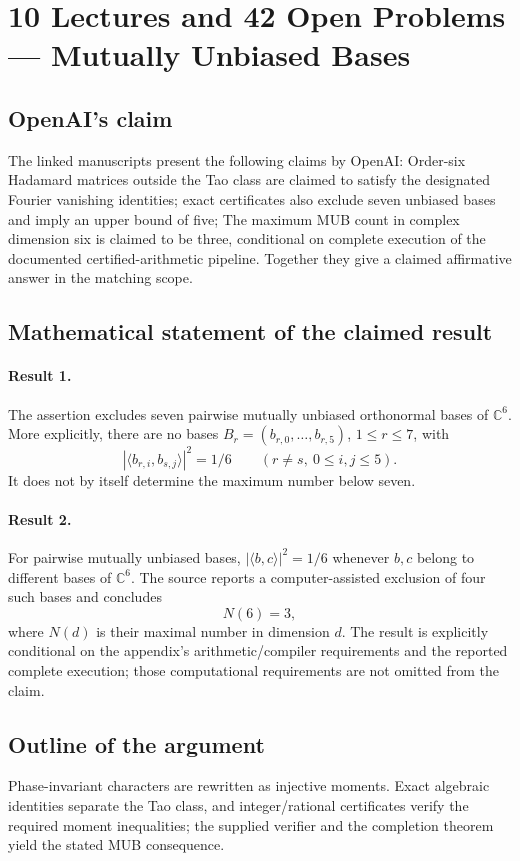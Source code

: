 \documentclass[11pt]{article}
\begin{document}
\section*{10 Lectures and 42 Open Problems — Mutually Unbiased Bases}

\subsection{OpenAI's claim}
The linked manuscripts present the following claims by OpenAI: Order-six Hadamard matrices outside the Tao class are claimed to satisfy the designated Fourier vanishing identities; exact certificates also exclude seven unbiased bases and imply an upper bound of five; The maximum MUB count in complex dimension six is claimed to be three, conditional on complete execution of the documented certified-arithmetic pipeline. Together they give a claimed affirmative answer in the matching scope.

\subsection{Mathematical statement of the claimed result}
\paragraph{Result 1.} The assertion excludes seven pairwise mutually unbiased orthonormal bases of \(\mathbb C^6\). More explicitly, there are no bases \(B_r=(b_{r,0},\ldots,b_{r,5})\), \(1\le r\le7\), with
\[
 |\langle b_{r,i},b_{s,j}\rangle|^2=1/6
 \qquad(r\ne s,\ 0\le i,j\le5).
\]
It does not by itself determine the maximum number below seven.

\paragraph{Result 2.} For pairwise mutually unbiased bases, \(|\langle b,c\rangle|^2=1/6\) whenever \(b,c\) belong to different bases of \(\mathbb C^6\). The source reports a computer-assisted exclusion of four such bases and concludes
\[
 N(6)=3,
\]
where \(N(d)\) is their maximal number in dimension \(d\). The result is explicitly conditional on the appendix's arithmetic/compiler requirements and the reported complete execution; those computational requirements are not omitted from the claim.

\subsection{Outline of the argument}
Phase-invariant characters are rewritten as injective moments. Exact algebraic identities separate the Tao class, and integer/rational certificates verify the required moment inequalities; the supplied verifier and the completion theorem yield the stated MUB consequence.
\end{document}
